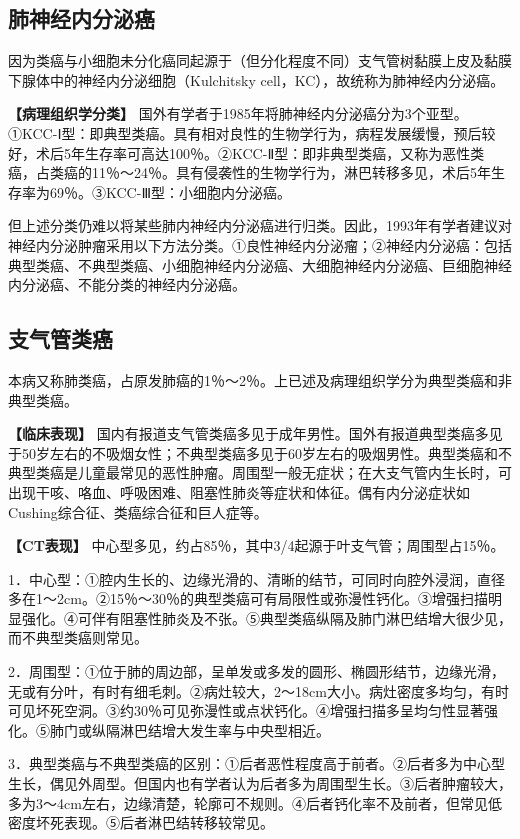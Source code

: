 \subsection{肺神经内分泌癌}

因为类癌与小细胞未分化癌同起源于（但分化程度不同）支气管树黏膜上皮及黏膜下腺体中的神经内分泌细胞（Kulchitsky
cell，KC），故统称为肺神经内分泌癌。

\textbf{【病理组织学分类】}
国外有学者于1985年将肺神经内分泌癌分为3个亚型。①KCC-Ⅰ型：即典型类癌。具有相对良性的生物学行为，病程发展缓慢，预后较好，术后5年生存率可高达100％。②KCC-Ⅱ型：即非典型类癌，又称为恶性类癌，占类癌的11％～24％。具有侵袭性的生物学行为，淋巴转移多见，术后5年生存率为69％。③KCC-Ⅲ型：小细胞内分泌癌。

但上述分类仍难以将某些肺内神经内分泌癌进行归类。因此，1993年有学者建议对神经内分泌肿瘤采用以下方法分类。①良性神经内分泌瘤；②神经内分泌癌：包括典型类癌、不典型类癌、小细胞神经内分泌癌、大细胞神经内分泌癌、巨细胞神经内分泌癌、不能分类的神经内分泌癌。

\subsection{支气管类癌}

本病又称肺类癌，占原发肺癌的1％～2％。上已述及病理组织学分为典型类癌和非典型类癌。

\textbf{【临床表现】}
国内有报道支气管类癌多见于成年男性。国外有报道典型类癌多见于50岁左右的不吸烟女性；不典型类癌多见于60岁左右的吸烟男性。典型类癌和不典型类癌是儿童最常见的恶性肿瘤。周围型一般无症状；在大支气管内生长时，可出现干咳、咯血、呼吸困难、阻塞性肺炎等症状和体征。偶有内分泌症状如Cushing综合征、类癌综合征和巨人症等。

\textbf{【CT表现】}
中心型多见，约占85％，其中3/4起源于叶支气管；周围型占15％。

1．中心型：①腔内生长的、边缘光滑的、清晰的结节，可同时向腔外浸润，直径多在1～2cm。②15％～30％的典型类癌可有局限性或弥漫性钙化。③增强扫描明显强化。④可伴有阻塞性肺炎及不张。⑤典型类癌纵隔及肺门淋巴结增大很少见，而不典型类癌则常见。

2．周围型：①位于肺的周边部，呈单发或多发的圆形、椭圆形结节，边缘光滑，无或有分叶，有时有细毛刺。②病灶较大，2～18cm大小。病灶密度多均匀，有时可见坏死空洞。③约30％可见弥漫性或点状钙化。④增强扫描多呈均匀性显著强化。⑤肺门或纵隔淋巴结增大发生率与中央型相近。

3．典型类癌与不典型类癌的区别：①后者恶性程度高于前者。②后者多为中心型生长，偶见外周型。但国内也有学者认为后者多为周围型生长。③后者肿瘤较大，多为3～4cm左右，边缘清楚，轮廓可不规则。④后者钙化率不及前者，但常见低密度坏死表现。⑤后者淋巴结转移较常见。

